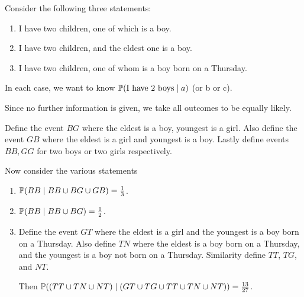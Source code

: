\documentclass[a4paper]{scrreprt}
\begin{document}
\begin{example}
	Consider the following three statements:
	\begin{enumerate}[label=(\alph*)]
		\item I have two children, one of which is a boy.
		\item I have two children, and the eldest one is a boy.
		\item I have two children, one of whom is a boy born on a Thursday.
	\end{enumerate}
	In each case, we want to know $\mathbb{P}(\text{I have 2 boys} \mid a)$ (or b or c).

	Since no further information is given, we take all outcomes to be equally likely.

	Define the event $BG$ where the eldest is a boy, youngest is a girl. Also define the event $GB$ where the eldest is a girl and youngest is a boy. Lastly define events $BB, GG$ for two boys or two girls respectively.
	
	Now consider the various statements
	\begin{enumerate}[label=(\alph*)]
		\item $\mathbb{P}(BB \mid BB \cup BG \cup GB) = \frac{1}{3}$.
		\item $\mathbb{P}(BB \mid BB \cup BG) = \frac{1}{2}$.
		\item Define the event $GT$ where the eldest is a girl and the youngest is a boy born on a Thursday. Also define $TN$ where the eldest is a boy born on a Thursday, and the youngest is a boy not born on a Thursday. Similarity define $TT$, $TG$, and $NT$.
		
		Then $\mathbb{P}((TT\cup TN \cup NT) \mid  (GT \cup TG \cup TT \cup TN \cup NT)) = \frac{13}{27}$.
	\end{enumerate}
\end{example}
\end{document}
